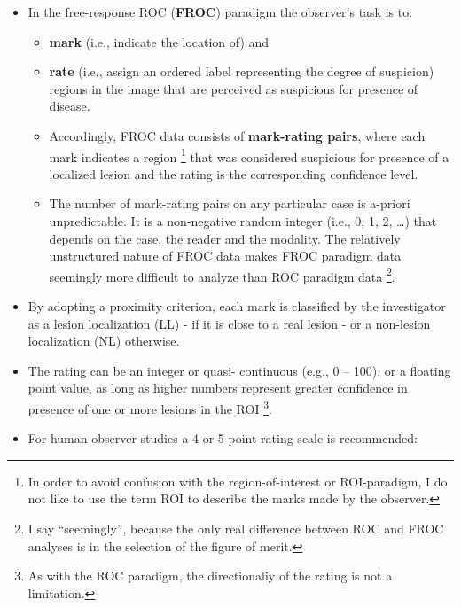 \documentclass[]{book}
\providecommand{\tightlist}{%
  \setlength{\itemsep}{0pt}\setlength{\parskip}{0pt}}
\let\rmarkdownfootnote\footnote%
\def\footnote{\protect\rmarkdownfootnote}
\begin{document}
\begin{itemize}
\tightlist
\item
  In the free-response ROC (\textbf{FROC}) paradigm \citep{RN85} the observer's task is to:

  \begin{itemize}
  \tightlist
  \item
    \textbf{mark} (i.e., indicate the location of) and
  \item
    \textbf{rate} (i.e., assign an ordered label representing the degree of suspicion) regions in the image that are perceived as suspicious for presence of disease.
  \item
    Accordingly, FROC data consists of \textbf{mark-rating pairs}, where each mark indicates a region \footnote{In order to avoid confusion with the region-of-interest or ROI-paradigm, I do not like to use the term ROI to describe the marks made by the observer.} that was considered suspicious for presence of a localized lesion and the rating is the corresponding confidence level.
  \item
    The number of mark-rating pairs on any particular case is a-priori unpredictable. It is a non-negative random integer (i.e., 0, 1, 2, \ldots{}) that depends on the case, the reader and the modality. The relatively unstructured nature of FROC data makes FROC paradigm data seemingly more difficult to analyze than ROC paradigm data \footnote{I say ``seemingly'', because the only real difference between ROC and FROC analyses is in the selection of the figure of merit.}.
  \end{itemize}
\item
  By adopting a proximity criterion, each mark is classified by the investigator as a lesion localization (LL) - if it is close to a real lesion - or a non-lesion localization (NL) otherwise.
\item
  The rating can be an integer or quasi- continuous (e.g., 0 -- 100), or a floating point value, as long as higher numbers represent greater confidence in presence of one or more lesions in the ROI \footnote{As with the ROC paradigm, the directionaliy of the rating is not a limitation.}.
\item
  For human observer studies a 4 or 5-point rating scale is recommended:


\end{itemize}
\end{document}
